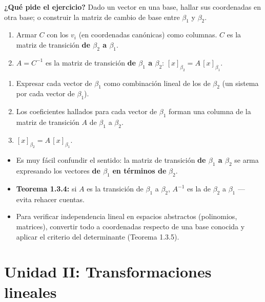 \documentclass[11pt,a4paper]{article}
\newcommand{\qpide}[1]{\textbf{¿Qué pide el ejercicio?} #1\par}
\begin{document}
\qpide{Dado un vector en una base, hallar sus coordenadas en otra base; o construir la
matriz de cambio de base entre $\beta_1$ y $\beta_2$.}

\begin{proc}[Caso: de la base canónica $\beta_1$ a otra base $\beta_2=\{v_1,\dots,v_n\}$]
\begin{enumerate}
    \item Armar $C$ con los $v_i$ (en coordenadas canónicas) como columnas. $C$ es la
    matriz de transición \textbf{de $\beta_2$ a $\beta_1$}.
    \item $A=C^{-1}$ es la matriz de transición \textbf{de $\beta_1$ a $\beta_2$}:
    $[x]_{\beta_2}=A\,[x]_{\beta_1}$.
\end{enumerate}
\end{proc}

\begin{proc}
\begin{enumerate}
    \item Expresar cada vector de $\beta_1$ como combinación lineal de los de $\beta_2$
    (un sistema por cada vector de $\beta_1$).
    \item Los coeficientes hallados para cada vector de $\beta_1$ forman una columna de la
    matriz de transición $A$ de $\beta_1$ a $\beta_2$.
    \item $[x]_{\beta_2}=A\,[x]_{\beta_1}$.
\end{enumerate}
\end{proc}

\begin{atencion}
\begin{itemize}
    \item Es muy fácil confundir el sentido: la matriz de transición \textbf{de $\beta_1$
    a $\beta_2$} se arma expresando los vectores \textbf{de $\beta_1$} \textbf{en
    términos de} $\beta_2$.
    \item \textbf{Teorema 1.3.4:} si $A$ es la transición de $\beta_1$ a $\beta_2$,
    $A^{-1}$ es la de $\beta_2$ a $\beta_1$ — evita rehacer cuentas.
    \item Para verificar independencia lineal en espacios abstractos (polinomios,
    matrices), convertir todo a coordenadas respecto de una base conocida y aplicar el
    criterio del determinante (Teorema 1.3.5).
\end{itemize}
\end{atencion}

\newpage
\section{Unidad II: Transformaciones lineales}
\end{document}
